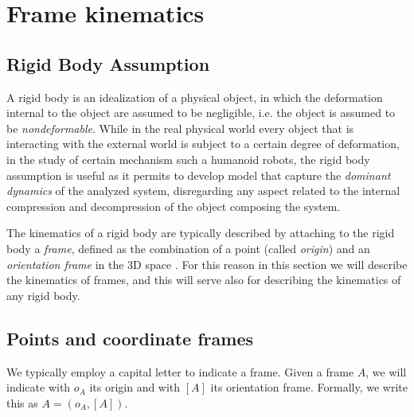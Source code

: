 \begin{itemize}

\end{itemize}

\section{Frame kinematics}

\subsection{Rigid Body Assumption}
\label{sec:rigidBodyAssumption}
A rigid body is an idealization of a physical object, in which the deformation internal to the object are assumed to be negligible, i.e. the object is assumed to be \emph{nondeformable}. While in the real physical world every object that is interacting with the external world is subject to a certain degree of deformation, in the study of certain mechanism such a humanoid robots, the rigid body assumption is useful as it permits to develop model that capture the \emph{dominant dynamics} of the analyzed system, disregarding any aspect related to the internal compression and decompression of the object composing the system. 


The kinematics of a rigid body are typically described by attaching to the rigid body a {\em frame}, defined as the combination of a point (called  {\em origin}) and an {\em orientation frame} in the 3D space \citep{DeLaet2013,spong2006}. For this reason in this section
we will describe the kinematics of frames, and this will serve also for describing the kinematics of any rigid body.

\subsection{Points and coordinate frames}

We typically employ 
a capital letter to indicate a frame. Given a frame $A$, we will indicate with $o_A$ its origin and with $[A]$ its orientation frame.
Formally, we write this as $A = (o_A, [A])$.

